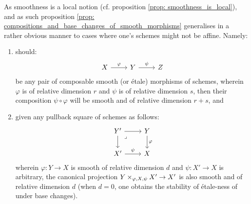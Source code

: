             \begin{remark}
                As smoothness is a local notion (cf. proposition \ref{prop: smoothness_is_local}), and as such proposition \ref{prop: compositions_and_base_changes_of_smooth_morphisms} generalises in a rather obvious manner to cases where one's schemes might not be affine. Namely:
                    \begin{enumerate}
                        \item should:
                            $$
                                \begin{tikzcd}
                                    	X & Y & Z
                                    	\arrow["\varphi", from=1-1, to=1-2]
                                    	\arrow["\psi", from=1-2, to=1-3]
                                    \end{tikzcd}
                            $$
                        be any pair of composable smooth (or \'etale) morphisms of schemes, wherein $\varphi$ is of relative dimension $r$ and $\psi$ is of relative dimension $s$, then their composition $\psi \circ \varphi$ will be smooth and of relative dimension $r + s$, and
                        \item given any pullback square of schemes as follows:
                            $$
                                \begin{tikzcd}
                                	{Y'} & Y \\
                                	{X'} & X
                                	\arrow["\psi", from=2-1, to=2-2]
                                	\arrow["\varphi", from=1-2, to=2-2]
                                	\arrow[from=1-1, to=1-2]
                                	\arrow[from=1-1, to=2-1]
                                	\arrow["\lrcorner"{anchor=center, pos=0.125}, draw=none, from=1-1, to=2-2]
                                \end{tikzcd}
                            $$
                        wherein $\varphi: Y \to X$ is smooth of relative dimension $d$ and $\psi: X' \to X$ is arbitrary, the canonical projection $Y \x_{\varphi, X, \psi} X' \to X'$ is also smooth and of relative dimension $d$ (when $d = 0$, one obtains the stability of \'etale-ness of under base changes).
                    \end{enumerate}
            \end{remark}
            
